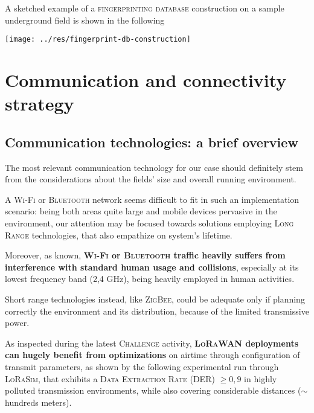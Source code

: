 \documentclass[a4paper,11pt]{article} %
\begin{document}
\medskip

A sketched example of a \textsc{fingerprinting database} construction on a sample underground field is shown in the following

\begin{center}
    \texttt{[image: ../res/fingerprint-db-construction]}
\end{center}

\section{Communication and connectivity strategy}\label{communication}
\subsection{Communication technologies: a brief overview}
The most relevant communication technology for our case should definitely stem from the considerations about the fields' size and overall running environment.

\smallskip

A \textsc{Wi-Fi} or \textsc{Bluetooth} network seems difficult to fit in such an implementation scenario: being both areas quite large and mobile devices pervasive in the environment, our attention may be focused towards solutions employing \textsc{Long Range} technologies, that also empathize on system's lifetime.

\smallskip

Moreover, as known, \textbf{\textsc{Wi-Fi} or \textsc{Bluetooth} traffic heavily suffers from interference with standard human usage and collisions}, especially at its lowest frequency band (2,4 GHz), being heavily employed in human activities.

\smallskip

Short range technologies instead, like \textsc{ZigBee}, could be adequate only if planning correctly the environment and its distribution, because of the limited transmissive power.

\smallskip

\label{challenge-lorasim}

As inspected during the latest \textsc{Challenge} activity, \textbf{\textsc{LoRaWAN} deployments can hugely benefit from optimizations} on airtime through configuration of transmit parameters, as shown by the following experimental run through \textsc{LoRaSim}, that exhibits a \textsc{Data Extraction Rate (DER)} $\geq 0,9$ in highly polluted transmission environments, while also covering considerable distances ($\sim$ hundreds meters).
\end{document}
